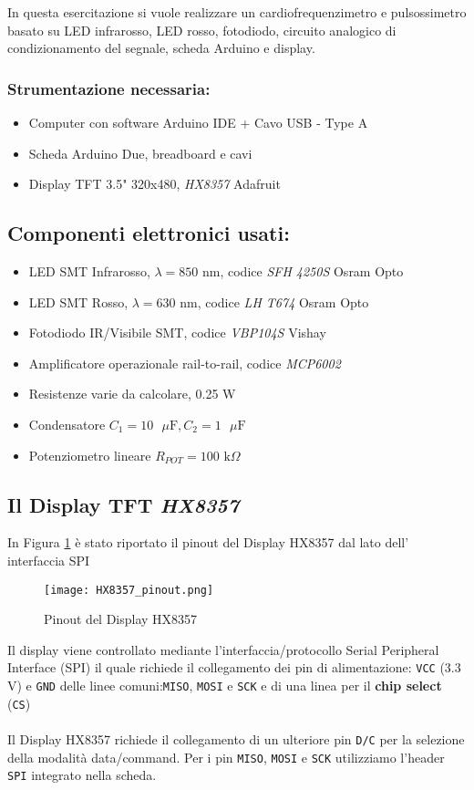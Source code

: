 In questa esercitazione si vuole realizzare un cardiofrequenzimetro e pulsossimetro basato su LED infrarosso, LED rosso, fotodiodo, circuito analogico di condizionamento del segnale, scheda Arduino e display.
\subsubsection*{Strumentazione necessaria:}
\begin{itemize}
    \item Computer con software Arduino IDE + Cavo USB - Type A
    \item Scheda Arduino Due, breadboard e cavi
    \item Display TFT 3.5" 320x480, \textit{HX8357} Adafruit
\end{itemize}
\subsection{Componenti elettronici usati:}
\begin{itemize}
    \item LED SMT Infrarosso, $\lambda=850$ nm, codice \textit{SFH 4250S} Osram Opto
    \item LED SMT Rosso, $\lambda=630$ nm, codice \textit{LH T674} Osram Opto
    \item Fotodiodo IR/Visibile SMT, codice \textit{VBP104S} Vishay
    \item Amplificatore operazionale rail-to-rail, codice \textit{MCP6002}
    \item Resistenze varie da calcolare, 0.25 W
    \item Condensatore $C_1=10\text{ }\mu\text{F},C_2=1\text{ }\mu\text{F}$
    \item Potenziometro lineare $R_{POT}=100\text{ k}\Omega$
\end{itemize}
\subsection{Il Display TFT \textit{HX8357}}
In Figura \ref{fig:HX8357_pinout} è stato riportato il pinout del Display HX8357 dal lato dell' interfaccia SPI
\begin{figure}[H]
    \centering
    \texttt{[image: HX8357\_pinout.png]}
    \caption{Pinout del Display HX8357}
    \label{fig:HX8357_pinout}
\end{figure}
\noindent Il display viene controllato mediante l'interfaccia/protocollo Serial Peripheral Interface (SPI) il quale richiede il collegamento dei pin di alimentazione: \texttt{VCC} ($3.3$V) e \texttt{GND} delle linee comuni:\texttt{MISO}, \texttt{MOSI} e \texttt{SCK} e di una linea per il \textbf{chip select} (\texttt{CS})\\\\
Il Display HX8357 richiede il collegamento di un ulteriore pin \texttt{D/C} per la selezione della modalità data/command. Per i pin \texttt{MISO}, \texttt{MOSI} e \texttt{SCK} utilizziamo l'header \texttt{SPI} integrato nella scheda.